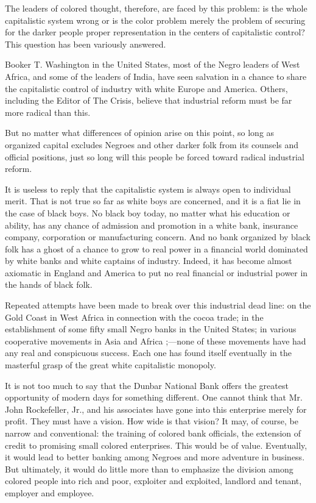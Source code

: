 \documentclass[letterpaper,10pt,english]{jupyterBook}
\begin{document}
\sphinxAtStartPar
The leaders of colored thought, therefore, are faced by this problem: is the whole capitalistic system wrong or is the color problem merely the problem of securing for the darker people proper representation in the centers of capitalistic control? This question has been variously answered.

\sphinxAtStartPar
Booker T. Washington in the United States, most of the Negro leaders of West Africa, and some of the leaders of India, have seen salvation in a chance to share the capitalistic control of industry with white Europe and America. Others, including the Editor of The Crisis, believe that industrial reform must be far more radical than this.

\sphinxAtStartPar
But no matter what differences of opinion arise on this point, so long as organized capital excludes Negroes and other darker folk from its counsels and official positions, just so long will this people be forced toward radical industrial reform.

\sphinxAtStartPar
It is useless to reply that the capitalistic system is always open to individual merit. That is not true so far as white boys are concerned, and it is a fiat lie in the case of black boys. No black boy today, no matter what his education or ability, has any chance of admission and promotion in a white bank, insurance company, corporation or manufacturing concern. And no bank organized by black folk has a ghost of a chance to grow to real power in a financial world dominated by white banks and white captains of industry. Indeed, it has become almost axiomatic in England and America to put no real financial or industrial power in the hands of black folk.

\sphinxAtStartPar
Repeated attempts have been made to break over this industrial dead line: on the Gold Coast in West Africa in connection with the cocoa trade; in the establishment of some fifty small Negro banks in the United States; in various co\sphinxhyphen{}operative movements in Asia and Africa ;—none of these movements have had any real and conspicuous success. Each one has found itself eventually in the masterful grasp of the great white capitalistic monopoly.

\sphinxAtStartPar
It is not too much to say that the Dunbar National Bank offers the greatest opportunity of modern days for something different. One cannot think that Mr. John Rockefeller, Jr., and his associates have gone into this enterprise merely for profit. They must have a vision. How wide is that vision? It may, of course, be narrow and conventional: the training of colored bank officials, the extension of credit to promising small colored enterprises. This would be of value. Eventually, it would lead to better banking among Negroes and more adventure in business. But ultimately, it would do little more than to emphasize the division among colored people into rich and poor, exploiter and exploited, landlord and tenant, employer and employee.
\end{document}
